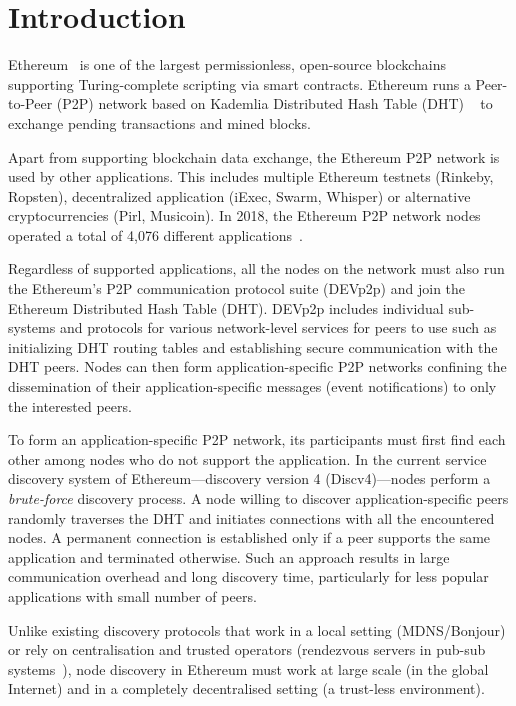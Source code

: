
\section{Introduction}
 Ethereum~\cite{buterin2013ethereum}  is one of the largest permissionless,  open-source  blockchains supporting Turing-complete scripting via smart contracts. Ethereum runs a Peer-to-Peer (P2P) network based on Kademlia Distributed Hash Table (DHT) ~\cite{maymounkov2002kademlia} to exchange pending transactions and mined blocks. 

Apart from supporting blockchain data exchange, the Ethereum P2P network is used by other applications. This includes multiple Ethereum testnets (Rinkeby, Ropsten), decentralized application (iExec, Swarm, Whisper) or alternative cryptocurrencies (Pirl, Musicoin). In 2018, the Ethereum P2P network nodes operated a total of 4,076 different applications~\cite{kim2018measuring}. 

Regardless of supported applications, all the nodes on the network must also run the Ethereum’s P2P communication protocol suite (DEVp2p) and join the Ethereum Distributed Hash Table (DHT). DEVp2p includes individual sub-systems and protocols for various network-level services for peers to use such as initializing DHT routing tables and establishing secure communication with the DHT peers. Nodes can then form application-specific P2P networks confining the dissemination of their application-specific messages (\eg event notifications) to only the interested peers.

To form an application-specific P2P network, its participants must first find each other among nodes who do not support the application. In the current service discovery system of Ethereum---\ie discovery version 4 (Discv4)---nodes perform a \textit{brute-force} discovery process. A node willing to discover application-specific peers randomly traverses the DHT and initiates connections with all the encountered nodes. A permanent connection is established only if a peer supports the same application and terminated otherwise. Such an approach results in large communication overhead and long discovery time, particularly for less popular applications with small number of peers.

Unlike existing discovery protocols that work in a local setting (MDNS/Bonjour) or rely on centralisation and trusted operators (\eg rendezvous servers in pub-sub systems~\cite{}), node discovery in Ethereum must work at large scale (in the global Internet) and in a completely decentralised setting  (\ie a trust-less environment). 

